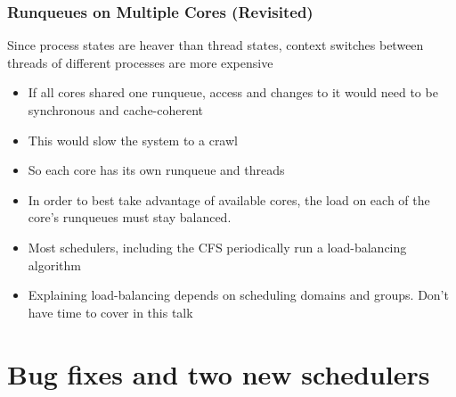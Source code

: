\documentclass{beamer}
\newcommand{\linespace}{\vskip 0.25cm}
\begin{document}
\begin{frame}
\frametitle{Runqueues on Multiple Cores (Revisited)}

Since process states are heaver than thread states, context switches between threads of different processes are more expensive

\linespace

\begin{itemize}
	\item If all cores shared one runqueue, access and changes to it would need to be synchronous and cache-coherent
	\item This would slow the system to a crawl
	\item So each core has its own runqueue and threads
\end{itemize}

\linespace

\begin{itemize}
\item In order to best take advantage of available cores, the load on each of the core's runqueues must stay balanced.
\item Most schedulers, including the CFS periodically run a load-balancing algorithm
\item Explaining load-balancing depends on scheduling domains and groups. Don't have time to cover in this talk
\end{itemize}
\end{frame}

\section[Bug Fixes and New Schedulers]{Bug fixes and two new schedulers}
\end{document}
